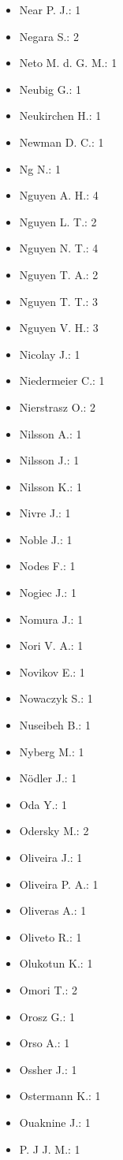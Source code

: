 \begin{itemize}
\item Near P. J.: 1
\item Negara S.: 2
\item Neto M. d. G. M.: 1
\item Neubig G.: 1
\item Neukirchen H.: 1
\item Newman D. C.: 1
\item Ng N.: 1
\item Nguyen A. H.: 4
\item Nguyen L. T.: 2
\item Nguyen N. T.: 4
\item Nguyen T. A.: 2
\item Nguyen T. T.: 3
\item Nguyen V. H.: 3
\item Nicolay J.: 1
\item Niedermeier C.: 1
\item Nierstrasz O.: 2
\item Nilsson A.: 1
\item Nilsson J.: 1
\item Nilsson K.: 1
\item Nivre J.: 1
\item Noble J.: 1
\item Nodes F.: 1
\item Nogiec J.: 1
\item Nomura J.: 1
\item Nori V. A.: 1
\item Novikov E.: 1
\item Nowaczyk S.: 1
\item Nuseibeh B.: 1
\item Nyberg M.: 1
\item Nödler J.: 1
\item Oda Y.: 1
\item Odersky M.: 2
\item Oliveira J.: 1
\item Oliveira P. A.: 1
\item Oliveras A.: 1
\item Oliveto R.: 1
\item Olukotun K.: 1
\item Omori T.: 2
\item Orosz G.: 1
\item Orso A.: 1
\item Ossher J.: 1
\item Ostermann K.: 1
\item Ouaknine J.: 1
\item P. J J. M.: 1

\end{itemize}
